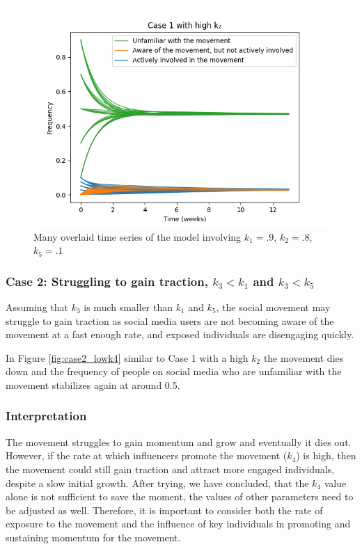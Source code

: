 \documentclass{article}
\begin{document}
    \begin{figure}[H]

        \centering
        \includegraphics[width=\textwidth]{simulation/plots/case1-highk2.png}   
        \caption{Many overlaid time series of the model involving \mbox{$k_1=.9$}, \mbox{$k_2=.8$}, \mbox{$k_5=.1$}}
        \label{fig:case1_highk2}
    \end{figure}


    \subsubsection*{Case 2: Struggling to gain traction, $k_3 < k_1$ and $k_3 < k_5$}
    Assuming that $k_3$ is much smaller than $k_1$ and $k_5$, the social movement may struggle to gain traction as social media users are not becoming aware of the movement at a fast enough rate, and exposed individuals are disengaging quickly. 

    In Figure \ref{fig:case2_lowk4} similar to Case 1 with a high $k_2$ the movement dies down and the frequency of people on social media who are unfamiliar with the movement stabilizes again at around 0.5.
    
    \subsubsection*{Interpretation} The movement  struggles to gain momentum and grow and eventually it dies out. However, if the rate at which influencers promote the movement ($k_4$) is high, then the movement could still gain traction and attract more engaged individuals, despite a slow initial growth. After trying, we have concluded, that the $k_4$ value alone is not sufficient to save the moment, the values of other parameters need to be adjusted as well. Therefore, it is important to consider both the rate of exposure to the movement and the influence of key individuals in promoting and sustaining momentum for the movement.
    
\end{document}
